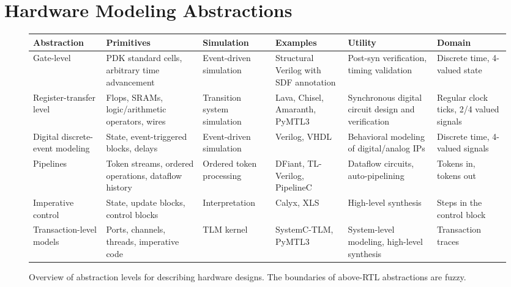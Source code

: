 \documentclass[sigplan,review,nonacm,10pt]{acmart}
\begin{document}

\maketitle

\section{Hardware Modeling Abstractions}

\begin{figure*}[!hbt]
\small
\begin{tabular}{>{\raggedright\arraybackslash}p{2cm}>{\raggedright\arraybackslash}p{3cm}>{\raggedright\arraybackslash}p{2cm}>{\raggedright\arraybackslash}p{3cm}>{\raggedright\arraybackslash}p{3cm}>{\raggedright\arraybackslash}p{2cm}}\toprule
\textbf{Abstraction} & \textbf{Primitives} & \textbf{Simulation} & \textbf{Examples} & \textbf{Utility} & \textbf{Domain} \\\midrule
Gate-level & PDK standard cells, arbitrary time advancement & Event-driven simulation & Structural Verilog with SDF annotation & Post-syn verification, timing validation & Discrete time, 4-valued state\\\midrule
Register-transfer level & Flops, SRAMs, logic/arithmetic operators, wires & Transition system simulation & Lava\cite{lava}, Chisel\cite{chisel}, Amaranth\cite{amaranth}, PyMTL3\cite{pymtl3} & Synchronous digital circuit design and verification & Regular clock ticks, 2/4 valued signals\\\midrule
Digital discrete-event modeling & State, event-triggered blocks, delays & Event-driven simulation & Verilog, VHDL & Behavioral modeling of digital/analog IPs & Discrete time, 4-valued signals\\\midrule
Pipelines & Token streams, ordered operations, dataflow history & Ordered token processing & DFiant\cite{dfiant}, TL-Verilog\cite{tlverilog}, PipelineC\cite{pipelinec} & Dataflow circuits, auto-pipelining & Tokens in, tokens out\\\midrule
Imperative control & State, update blocks, control blocks & Interpretation & Calyx\cite{calyx}, XLS\cite{xls} & High-level synthesis & Steps in the control block\\\midrule
Transaction-level models & Ports, channels, threads, imperative code & TLM kernel & SystemC-TLM, PyMTL3 & System-level modeling, high-level synthesis & Transaction traces\\\bottomrule
\end{tabular}
\caption{Overview of abstraction levels for describing hardware designs. The boundaries of above-RTL abstractions are fuzzy.}
\label{fig:abstractions}
\end{figure*}
\end{document}
